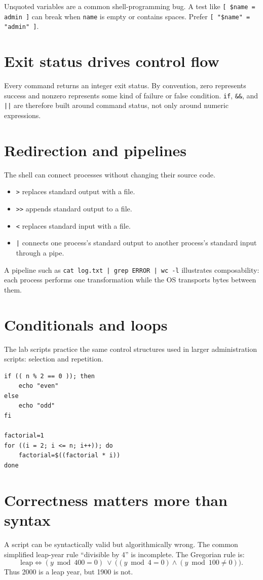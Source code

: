 \begin{pitfall}
Unquoted variables are a common shell-programming bug. A test like \texttt{[ \$name = admin ]} can break when \texttt{name} is empty or contains spaces. Prefer \texttt{[ "\$name" = "admin" ]}.
\end{pitfall}

\section{Exit status drives control flow}
Every command returns an integer exit status. By convention, zero represents success and nonzero represents some kind of failure or false condition. \texttt{if}, \texttt{\&\&}, and \texttt{||} are therefore built around command status, not only around numeric expressions.

\section{Redirection and pipelines}
The shell can connect processes without changing their source code.
\begin{itemize}
  \item \texttt{>} replaces standard output with a file.
  \item \texttt{>>} appends standard output to a file.
  \item \texttt{<} replaces standard input with a file.
  \item \texttt{|} connects one process's standard output to another process's standard input through a pipe.
\end{itemize}
A pipeline such as \texttt{cat log.txt | grep ERROR | wc -l} illustrates composability: each process performs one transformation while the OS transports bytes between them.

\section{Conditionals and loops}
The lab scripts practice the same control structures used in larger administration scripts: selection and repetition.
\begin{lstlisting}[style=osbash]
if (( n % 2 == 0 )); then
    echo "even"
else
    echo "odd"
fi

factorial=1
for ((i = 2; i <= n; i++)); do
    factorial=$((factorial * i))
done
\end{lstlisting}

\section{Correctness matters more than syntax}
A script can be syntactically valid but algorithmically wrong. The common simplified leap-year rule ``divisible by 4'' is incomplete. The Gregorian rule is:
\[
\text{leap} \iff (y \bmod 400 = 0)\ \lor\ \big((y \bmod 4 = 0) \land (y \bmod 100 \ne 0)\big).
\]
Thus 2000 is a leap year, but 1900 is not.

